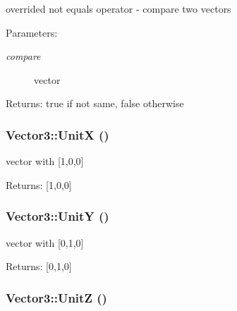 overrided not equals operator - compare two vectors \begin{Desc}
\item[Parameters:]
\begin{description}
\item[{\em compare}]vector \end{description}
\end{Desc}
\begin{Desc}
\item[Returns:]true if not same, false otherwise \end{Desc}
\hypertarget{class_vector3_8967211f669da76a8c56761e0fed00a5}{
\subsubsection[UnitX]{ Vector3::UnitX ()}}
\label{class_vector3_8967211f669da76a8c56761e0fed00a5}


vector with \mbox{[}1,0,0\mbox{]} \begin{Desc}
\item[Returns:]\mbox{[}1,0,0\mbox{]} \end{Desc}
\hypertarget{class_vector3_f35f3d7a50ca12ff28bbaaec3c94c53d}{
\subsubsection[UnitY]{ Vector3::UnitY ()}}
\label{class_vector3_f35f3d7a50ca12ff28bbaaec3c94c53d}


vector with \mbox{[}0,1,0\mbox{]} \begin{Desc}
\item[Returns:]\mbox{[}0,1,0\mbox{]} \end{Desc}
\hypertarget{class_vector3_423c3c9c3848e16f0a6add16559f995b}{
\subsubsection[UnitZ]{ Vector3::UnitZ ()}}
\label{class_vector3_423c3c9c3848e16f0a6add16559f995b}



